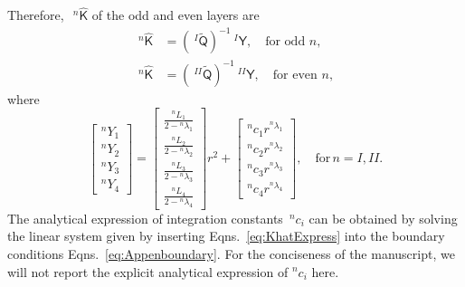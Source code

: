 \documentclass[preprint,10pt,times]{elsarticle}
\numberwithin{equation}{section}
\renewcommand{\u}[1]{\boldsymbol{#1}}
\newcommand{\usf}[1]{\u{\mathsf #1}}
\renewcommand{\>}{$\Rightarrow$}
\begin{document}
Therefore,~$~^{n}{\hat{\usf{K}}}$ of the odd and even layers are
\begin{subequations}
\begin{align}
~^{n}{\hat{\usf{K}}} & = \left( ~^{I}\tilde{\usf{Q}} \right)^{-1}~^{I}\usf{Y}, \quad \text{for odd~$n$}, \\
~^{n}{\hat{\usf{K}}} & = \left( ~^{II}\tilde{\usf{Q}} \right)^{-1}~^{II}\usf{Y}, \quad \text{for even~$n$},
\end{align}
\label{eq:KhatExpress}
\end{subequations}
where
\begin{equation}
	\begin{bmatrix}
	 {}^{n}\!{Y_{1}} \\ {}^{n}\!{Y_{2}} \\ {}^{n}\!{Y_{3}} \\ {}^{n}\!{Y_{4}}
	\end{bmatrix}
	=
	\begin{bmatrix}
	 \frac{{}^{n}\!{L_{1}}}{2-{}^{n}\!{\lambda_{1}}} \\ \frac{{}^{n}\!{L_{2}}}{2-{}^{n}\!{\lambda_{2}}} \\ \frac{{}^{n}\!{L_{3}}}{2-{}^{n}\!{\lambda_{3}}} \\ \frac{{}^{n}\!{L_{4}}}{2-{}^{n}\!{\lambda_{4}}}
	\end{bmatrix}r^2
	+
	\begin{bmatrix}
	 {}^{n}\!{c_{1}} r^{{}^{n}\!{\lambda_{1}}} \\ {}^{n}\!{c_{2}} r^{{}^{n}\!{\lambda_{2}}} \\ {}^{n}\!{c_{3}} r^{{}^{n}\!{\lambda_{3}}} \\ {}^{n}\!{c_{4}} r^{{}^{n}\!{\lambda_{4}}}
	\end{bmatrix}, \quad \text{for} \, n = I, II.
\end{equation}
The analytical expression of integration constants~${}^{n}\!{c_{i}}$ can be obtained by solving the linear system given by inserting Eqns.~\eqref{eq:KhatExpress} into the boundary conditions Eqns.~\eqref{eq:Appenboundary}. For the conciseness of the manuscript, we will not report the explicit analytical expression of ${}^{n}\!{c_{i}}$ here.
\end{document}
